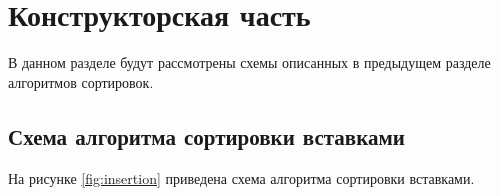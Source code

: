 \chapter{Конструкторская часть}

В данном разделе будут рассмотрены схемы описанных в предыдущем разделе алгоритмов сортировок.

\section{Схема алгоритма сортировки вставками}

На рисунке \ref{fig:insertion} приведена схема алгоритма сортировки вставками.

\begin{figure}[h!]
	
	

\end{figure}
